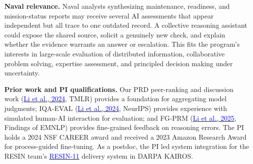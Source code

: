 \documentclass[10pt,letterpaper]{article}
\newcommand{\head}[1]{\textbf{#1}\enspace}
\begin{document}
\par\head{Naval relevance.} Naval analysts synthesizing maintenance, readiness, and mission-status reports may receive several AI assessments that appear independent but all trace to one outdated record. A collective reasoning assistant could expose the shared source, solicit a genuinely new check, and explain whether the evidence warrants an answer or escalation. This fits the program's interests in large-scale evaluation of distributed information, collaborative problem solving, expertise assessment, and principled decision making under uncertainty.
\par\head{Prior work and PI qualifications.} Our PRD peer-ranking and discussion work (\href{https://arxiv.org/abs/2307.02762}{\textcolor{blue}{Li et al., 2024}}, TMLR) provides a foundation for aggregating model judgments; IQA-EVAL (\href{https://proceedings.neurips.cc/paper_files/paper/2024/file/c6a23b26eaaefd187973658f5001f4fe-Paper-Conference.pdf}{\textcolor{blue}{Li et al., 2024}}, NeurIPS) provides experience with simulated human-AI interaction for evaluation; and FG-PRM (\href{https://doi.org/10.18653/v1/2025.findings-emnlp.228}{\textcolor{blue}{Li et al., 2025}}, Findings of EMNLP) provides fine-grained feedback on reasoning errors. The PI holds a 2024 NSF CAREER award and received a 2023 Amazon Research Award for process-guided fine-tuning. As a postdoc, the PI led system integration for the RESIN team's \href{https://doi.org/10.18653/v1/2022.naacl-demo.7}{\textcolor{blue}{RESIN-11}} delivery system in DARPA KAIROS.
\end{document}
